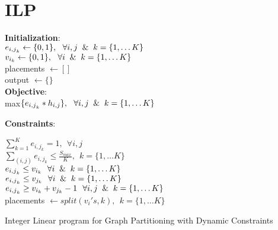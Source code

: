 \documentclass[13pt, letterpaper]{article}
\begin{document}
 

\section{ILP}
\begin{algorithm}[H]

\SetAlgoLined
{}
 \vspace*{.1cm}
 \vspace*{.1cm}
 \textbf{Initialization}: \\
 $e_{{i,j}_k} \leftarrow \{0,1\}, \ \  \forall i,j \And k = \{1, \dots K\} $\\
 $v_{i_{k}} \leftarrow \{0,1\}, \ \ \forall i \And k = \{1, \dots K\}$\\ 
 placements $\leftarrow \left[ \right]$ \\
 output $\leftarrow \{\}$\\
  \vspace*{.1cm}
 \textbf{Objective}: \\
 max$\{e_{{i,j}_{k}} * h_{i,j}\}, \ \ \forall i,j \And k = \{1, \dots K\}$

  \vspace*{.1cm}
 \textbf{Constraints}:

 \vspace*{.1cm}
$\sum_{k = 1}^{K} e_{{i,j}_{k}} = 1, \ \  \forall i,j $ \\
$\sum_{(i,j)} e_{{i,j}_{k}} \leq \frac{S_{max}}{K}, \ \ k = \{1, \dots K\}$\\
$e_{{i,j}_{k}} \leq v_{i_{k}} \ \ \forall i \And k = \{1, \dots K\}$ \\ 
$e_{{i,j}_{k}} \leq v_{j_{k}} \ \ \forall i \And k = \{1, \dots K\}$\\
$e_{{i,j}_{k}} \geq v_{i_{k}} +  v_{j_{k}} -1 \ \ \forall i,j \And k = \{1, \dots K\}$\\
placements $\leftarrow \textit{split}(v_{i}'s, k), \ \ k = \{1, \dots K\}$\\
 \caption{Integer Linear program for Graph Partitioning with Dynamic Constraints}
\end{algorithm}









\label{totalpag} 
\end{document}
